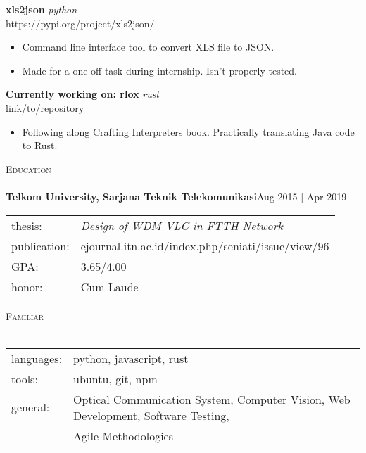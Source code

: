 \documentclass[a4paper]{article}
\newcommand{\lineunder} {
    \vspace*{-8pt} \\
    \hspace*{-18pt} \hrulefill \\
}
\newcommand{\header} [1] {
    {\hspace*{-18pt}\vspace*{6pt} \textsc{#1}}
    \vspace*{-6pt} \lineunder
}
\begin{document}
{\textbf{xls2json}} \hfill {\sl python}\\https://pypi.org/project/xls2json/\\
\vspace{-1mm}
\begin{itemize} \itemsep 1pt
	\item Command line interface tool to convert XLS file to JSON.  
	\item Made for a one-off task during internship. Isn't properly tested.
\end{itemize}
\vspace*{2mm}
{\textbf{Currently working on: rlox}} \hfill {\sl rust}\\link/to/repository\\
\vspace{-1mm}
\begin{itemize} \itemsep 1pt
	\item Following along Crafting Interpreters book. Practically translating Java code to Rust.
\end{itemize}

\header{Education}
\textbf{Telkom University, Sarjana Teknik Telekomunikasi}\hfill Aug 2015 | Apr 2019\\


\begin{tabular}{ l l }
  thesis:       & \textit{Design of WDM VLC in FTTH Network}\\
  publication:  & ejournal.itn.ac.id/index.php/seniati/issue/view/96\\
  GPA:          & 3.65/4.00\\ 
  honor:        & Cum Laude\\
\end{tabular}
\vspace{2mm}

\header{Familiar}
\begin{tabular}{ l l }
  languages: & python, javascript, rust\\
  tools: & ubuntu, git, npm\\        
  general: & Optical Communication System, Computer Vision, Web Development, Software Testing, \\
  & Agile Methodologies\\                   
\end{tabular}
\vspace{2mm}

\ 
\end{document}
